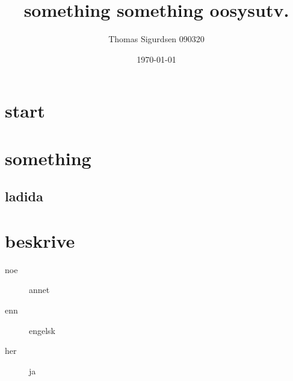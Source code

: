 \documentclass{article}%
\title{something something oosysutv.}
\author{Thomas Sigurdsen 090320 \\
} %
\date{\today}
\begin{document}
\maketitle       %
\tableofcontents
\section{start}

\section{something}
\subsection{ladida}
\section{beskrive}
\begin{description}
\item [noe] annet
\item [enn] engelsk
\item [her] ja
\end{description}
\end{document}
